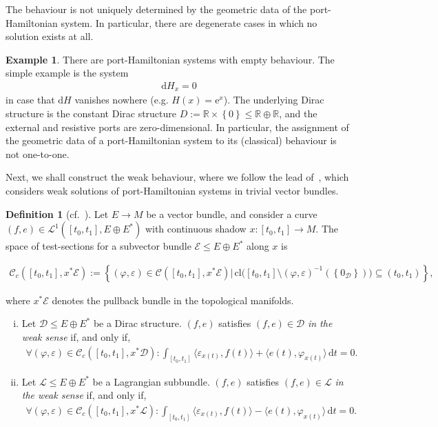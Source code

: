 \documentclass[preprint,12pt]{elsarticle}
\theoremstyle{definition}
\newtheorem{example}[theorem]{Example}
\newtheorem{definition}[theorem]{Definition}
\newcommand{\set}[1]{\left\lbrace #1\right\rbrace}
\renewcommand{\exp}[1]{{\mathrm{e}^{#1}}}
\begin{document}
The behaviour is not uniquely determined by the geometric data of the port-Hamiltonian system. In particular, there are degenerate cases in which no solution exists at all.

\begin{example}
There are port-Hamiltonian systems with empty behaviour. The simple example is the system
\begin{align*}
\mathrm{d}H_x = 0
\end{align*}
in case that $\mathrm{d}H$ vanishes nowhere (e.g. $H(x)=\exp{x}$). The underlying Dirac structure is the constant Dirac structure $D := \mathbb{R}\times\set{0}\leq \mathbb{R}\oplus\mathbb{R}$, and the external and resistive ports are zero-dimensional. In particular, the assignment of the geometric data of a port-Hamiltonian system to its (classical) behaviour is not one-to-one.
\end{example}

Next, we shall construct the weak behaviour, where we follow the lead of~\cite{Reis25b}, which considers weak solutions of port-Hamiltonian systems in trivial vector bundles.

\begin{definition}[cf.~\cite{Reis25b}]
Let $E\to M$ be a vector bundle, and consider a curve $(f,e)\in\mathcal{L}^1([t_0,t_1],E\oplus E^*)$ with continuous shadow $x:[t_0,t_1]\to M$. The space of test-sections for a subvector bundle $\mathcal{E}\leq E\oplus E^*$ along $x$ is
\begin{small}
\begin{align*}
\mathcal{C}_c([t_0,t_1],x^*\mathcal{E}) := \set{(\varphi,\varepsilon)\in\mathcal{C}([t_0,t_1],x^*\mathcal{E})\big\vert\,\mathrm{cl}\big([t_0,t_1]\setminus(\varphi,\varepsilon)^{-1}(\set{0_\mathcal{D}})\big)\subseteq(t_0,t_1)},
\end{align*}
\end{small}
where $x^*\mathcal{E}$ denotes the pullback bundle in the topological manifolds.
\begin{enumerate}[(i)]
\item Let $\mathcal{D}\leq E\oplus E^*$ be a Dirac structure. $(f,e)$ satisfies $(f,e)\in\mathcal{D}$ \textit{in the weak sense} if, and only if,
\begin{align*}
\forall(\varphi,\varepsilon)\in\mathcal{C}_c([t_0,t_1],x^*\mathcal{D}): \int_{[t_0,t_1]} \langle \varepsilon_{x(t)},f(t)\rangle+\langle e(t),\varphi_{x(t)}\rangle\,\mathrm{d}t = 0.
\end{align*}
\item Let $\mathcal{L}\leq E\oplus E^*$ be a Lagrangian subbundle. $(f,e)$ satisfies $(f,e)\in\mathcal{L}$ \textit{in the weak sense} if, and only if,
\begin{align*}
\forall(\varphi,\varepsilon)\in\mathcal{C}_c([t_0,t_1],x^*\mathcal{L}): \int_{[t_0,t_1]} \langle \varepsilon_{x(t)},f(t)\rangle-\langle e(t),\varphi_{x(t)}\rangle\,\mathrm{d}t = 0.
\end{align*}
\end{enumerate}
\end{definition}
\end{document}
